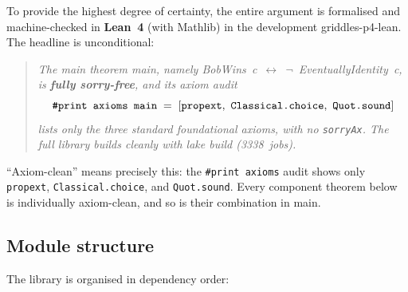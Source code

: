 \documentclass{article}
\newcommand{\lean}[1]{{\small\ttfamily #1}}
\begin{document}
To provide the highest degree of certainty, the entire argument is
formalised and machine-checked in \textbf{Lean~4} (with Mathlib) in the
development \lean{griddles-p4-lean}. The headline is unconditional:

\begin{quote}
\itshape
The main theorem \lean{main}, namely
\lean{BobWins~c~$\leftrightarrow$~$\lnot$~EventuallyIdentity~c},
is \textbf{fully \lean{sorry}-free}, and its axiom audit
\[
  \verb|#print axioms main| \;=\; [\verb|propext|,\ \verb|Classical.choice|,\ \verb|Quot.sound|]
\]
lists \emph{only} the three standard foundational axioms, with \emph{no}
\verb|sorryAx|. The full library builds cleanly with \lean{lake build}
(3338~jobs).
\end{quote}

``Axiom-clean'' means precisely this: the \verb|#print axioms| audit shows
only \verb|propext|, \verb|Classical.choice|, and \verb|Quot.sound|. Every
component theorem below is individually axiom-clean, and so is their
combination in \lean{main}.

\subsection{Module structure}

The library is organised in dependency order:
\end{document}
